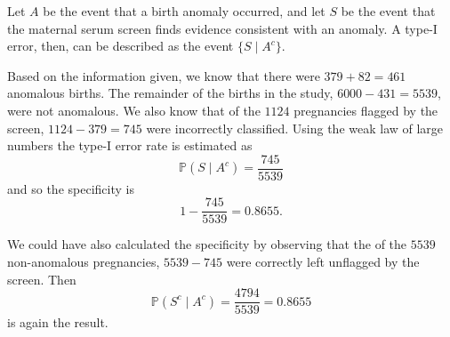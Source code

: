 \documentclass[../book.tex]{subfiles}
\begin{document}
\begin{solution}
Let \(A\) be the event that a birth anomaly occurred, and let \(S\) be the event that the maternal serum screen finds evidence consistent with an anomaly. A type-I error, then, can be described as the event \(\{ S \mid  A^c\}\).

Based on the information given, we know that there were \(379+82 = 461\) anomalous births. The remainder of the births in the study, \(6 000 - 431 = 5 539\), were not anomalous. We also know that of the \(1 124\) pregnancies flagged by the screen, \(1 124 - 379 = 745\) were incorrectly classified.
Using the weak law of large numbers the type-I error rate is estimated as
\begin{equation}\label{eq:prob-10}
\mathbb{P} ( S \mid  A^c ) = \frac{745}{5 539}
\end{equation}
and so the specificity is
\begin{equation}\label{eq:prob-11}
1 - \frac{745}{5 539} = 0.8655.
\end{equation}

We could have also calculated the specificity by observing that the of the \(5 539\) non-anomalous pregnancies, \(5 539 - 745\) were correctly left unflagged by the screen. Then
\begin{equation}\label{eq:prob-12}
\mathbb{P}(S^c  \mid  A^c )
=
\frac{4 794}{5 539} 
=
0.8655
\end{equation}
is again the result.
\end{solution}
\end{document}
